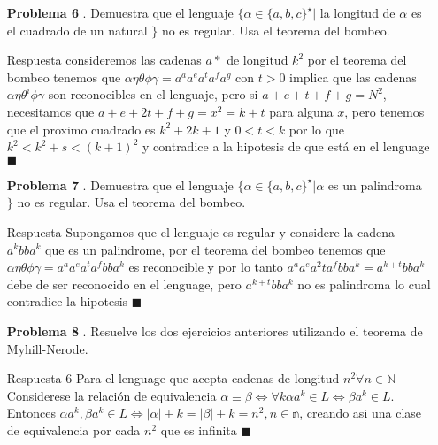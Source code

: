 \documentclass{article}
\begin{document}
\begin{enumerate}
\begin{tikzpicture}[->,>=stealth',shorten >=1pt,auto,node distance=2cm,
  thick,main node/.style={circle,fill=blue!20,draw,font=\sffamily\Large\bfseries}]
\end{tikzpicture}


\item[\bf{Problema 6}]. Demuestra que el lenguaje
$\{\alpha \in \{a, b, c\}^\star | $ la longitud de $\alpha$ es el cuadrado de un natural $\}$
no es regular. Usa el teorema del bombeo.
\item[Respuesta]
consideremos las cadenas $a*$ de longitud $k^2$ 
por el teorema del bombeo tenemos que $\alpha\eta\theta\phi\gamma=a^aa^ea^ta^fa^g$ con $t > 0$ implica que las cadenas $\alpha\eta\theta^i\phi\gamma$ son reconocibles en el lenguaje, pero si $a+e+t+f+g=N^2$, necesitamos que $a+e+2t+f+g=x^2 = k + t$ para alguna $x$, pero tenemos que el proximo cuadrado es $k^2+2k+1$ y $0<t<k$ por lo que $k^2<k^2+s< (k+1)^2$ y contradice a la hipotesis de que está en el lenguage $\blacksquare$

\item[\bf{Problema 7}]. Demuestra que el lenguaje
$\{\alpha \in \{a, b, c\}^\star | \alpha $ es un palindroma $\}$
no es regular. Usa el teorema del bombeo.
\item[Respuesta]
Supongamos que el lenguaje es regular y considere la cadena $a^kbba^k$ que es un palindrome, por el teorema del bombeo tenemos que $\alpha\eta\theta\phi\gamma=a^aa^ea^ta^fbba^k$ es reconocible y por lo tanto $a^aa^ea^2ta^fbba^k = a^{k+t}bba^k$ debe de ser reconocido en el lenguage, pero $a^{k+t}bba^k$ no es palindroma lo cual contradice la hipotesis $\blacksquare$


\item[\bf{Problema 8}]. Resuelve los dos ejercicios anteriores utilizando el teorema de Myhill-Nerode.

\item[Respuesta 6] Para el lenguage que acepta cadenas de longitud $n^2 \forall n \in \mathbb{N}$  Considerese la relación de equivalencia $\alpha \equiv \beta \Leftrightarrow \forall k \alpha a^k \in L \Leftrightarrow \beta a^k \in L$. Entonces $\alpha a^k, \beta a^k \in L  \Leftrightarrow |\alpha|+k =|\beta|+k=n^2, n \in \mathbb{n}$, creando asi una clase de equivalencia por cada $n^2$ que es infinita $\blacksquare$

\end{enumerate}
\end{document}

